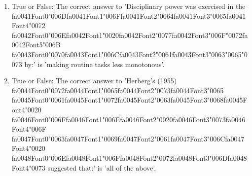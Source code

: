 \documentclass[12pt]{article}
\begin{document}
\begin{enumerate}[label=\arabic*.]
\item True or False: The correct answer to 'Disciplinary power was exercised in the {\csname fa0041Font0\endcsname\char"006D}{\csname fa0041Font1\endcsname\char"006F}{\csname fa0041Font2\endcsname\char"0064}{\csname fa0041Font3\endcsname\char"0065}{\csname fa0041Font4\endcsname\char"0072} {\csname fa0042Font0\endcsname\char"006E}{\csname fa0042Font1\endcsname\char"0020}{\csname fa0042Font2\endcsname\char"0077}{\csname fa0042Font3\endcsname\char"006F}{\char"0072}{\csname fa0042Font5\endcsname\char"006B} {\csname fa0043Font0\endcsname\char"0070}{\csname fa0043Font1\endcsname\char"006C}{\csname fa0043Font2\endcsname\char"0061}{\csname fa0043Font3\endcsname\char"0063}{\char"0065}{\char"0073} by:' is 'making routine tasks less monotonous'.
\item True or False: The correct answer to 'Herberg's (1955) {\csname fa0044Font0\endcsname\char"0072}{\csname fa0044Font1\endcsname\char"0065}{\csname fa0044Font2\endcsname\char"0073}{\csname fa0044Font3\endcsname\char"0065} {\csname fa0045Font0\endcsname\char"0061}{\csname fa0045Font1\endcsname\char"0072}{\csname fa0045Font2\endcsname\char"0063}{\csname fa0045Font3\endcsname\char"0068}{\csname fa0045Font4\endcsname\char"0020} {\csname fa0046Font0\endcsname\char"006F}{\csname fa0046Font1\endcsname\char"006E}{\csname fa0046Font2\endcsname\char"0020}{\csname fa0046Font3\endcsname\char"0073}{\csname fa0046Font4\endcsname\char"006F} {\csname fa0047Font0\endcsname\char"0063}{\csname fa0047Font1\endcsname\char"0069}{\csname fa0047Font2\endcsname\char"0061}{\csname fa0047Font3\endcsname\char"006C}{\csname fa0047Font4\endcsname\char"0020} {\csname fa0048Font0\endcsname\char"006E}{\csname fa0048Font1\endcsname\char"006F}{\csname fa0048Font2\endcsname\char"0072}{\csname fa0048Font3\endcsname\char"006D}{\csname fa0048Font4\endcsname\char"0073} suggested that:' is 'all of the above'.

\end{enumerate}
\end{document}
